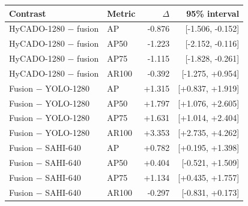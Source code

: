 \begin{tabular}{llrr}
\toprule
Contrast & Metric & $\Delta$ & 95\% interval\\
\midrule
HyCADO-1280 $-$ fusion & AP & -0.876 & [-1.506, -0.152]\\
HyCADO-1280 $-$ fusion & AP50 & -1.223 & [-2.152, -0.116]\\
HyCADO-1280 $-$ fusion & AP75 & -1.115 & [-1.828, -0.261]\\
HyCADO-1280 $-$ fusion & AR100 & -0.392 & [-1.275, +0.954]\\
Fusion $-$ YOLO-1280 & AP & +1.315 & [+0.837, +1.919]\\
Fusion $-$ YOLO-1280 & AP50 & +1.797 & [+1.076, +2.605]\\
Fusion $-$ YOLO-1280 & AP75 & +1.631 & [+1.014, +2.404]\\
Fusion $-$ YOLO-1280 & AR100 & +3.353 & [+2.735, +4.262]\\
Fusion $-$ SAHI-640 & AP & +0.782 & [+0.195, +1.398]\\
Fusion $-$ SAHI-640 & AP50 & +0.404 & [-0.521, +1.509]\\
Fusion $-$ SAHI-640 & AP75 & +1.134 & [+0.435, +1.757]\\
Fusion $-$ SAHI-640 & AR100 & -0.297 & [-0.831, +0.173]\\
\bottomrule
\end{tabular}
